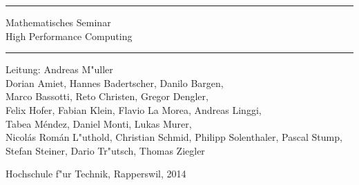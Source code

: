 \documentclass{book}
\begin{document}
\pagestyle{fancy}
\frontmatter
\newcommand\HRule{\noindent\rule{\linewidth}{1.5pt}}
\begin{titlepage}
\HRule
\vspace*{5pt}
\begin{flushright}
{
\LARGE
Mathematisches Seminar\\
\vspace*{20pt}
\Huge
High Performance Computing}
\end{flushright}
\HRule
\begin{flushright}
\vspace{60pt}
\Large
Leitung: Andreas M"uller\\
\vspace{40pt}
\Large
Dorian Amiet,
Hannes Badertscher,
Danilo Bargen,\\
Marco Bassotti,
Reto Christen,
Gregor Dengler,\\
Felix Hofer,
Fabian Klein,
Flavio La Morea,
Andreas Linggi,\\
Tabea M\'endez,
Daniel Monti,
Lukas Murer,\\
Nicol\'as Rom\'an L"uthold,
Christian Schmid,
Philipp Solenthaler,
Pascal Stump,
Stefan Steiner,
Dario Tr"utsch,
Thomas Ziegler
\end{flushright}
\begin{center}
Hochschule f"ur Technik, Rapperswil, 2014
\end{center}
\end{titlepage}
\hypersetup{
    colorlinks=true,
    linktoc=all,
    linkcolor=blue
}
\newenvironment{beispiele}{
\bgroup\smallskip\parindent0pt\bf Beispiele\egroup

\begin{list}{\arabic{beispiel}.}
  {\usecounter{beispiel}
  \setlength{\labelsep}{5mm}
  \setlength{\rightmargin}{0pt}
}}{\end{list}}
\newenvironment{uebungsaufgaben}{
\begin{list}{\arabic{uebungsaufgabe}.}
  {\usecounter{uebungsaufgabe}
  \setlength{\labelwidth}{2cm}
  \setlength{\leftmargin}{0pt}
  \setlength{\labelsep}{5mm}
  \setlength{\rightmargin}{0pt}
  \setlength{\itemindent}{0pt}
}}{\end{list}\vfill\pagebreak}
\newenvironment{teilaufgaben}{
\begin{enumerate}
\renewcommand{\labelenumi}{\alph{enumi})}
}{\end{enumerate}}
\def\swallow#1{
}
\newenvironment{loesung}{%
\begin{proof}[L"osung]%
\renewcommand{\qedsymbol}{$\bigcirc$}
}{\end{proof}}
\newenvironment{diskussion}{}{}
\def\keineloesungen{%
\renewenvironment{loesung}{\swallow\begingroup}{\endgroup}%
\renewenvironment{diskussion}{\swallow\begingroup}{\endgroup}%
}
\newenvironment{beispiel}{%
\begin{proof}[Beispiel]%
\renewcommand{\qedsymbol}{$\bigcirc$}
}{\end{proof}}
\end{document}
